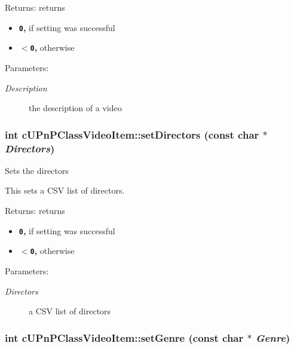 \begin{Desc}
\item[Returns:]returns\begin{itemize}
\item {\bf {\tt 0},} if setting was successful\item {\bf {\tt $<$0},} otherwise \end{itemize}
\end{Desc}
\begin{Desc}
\item[Parameters:]
\begin{description}
\item[{\em Description}]the description of a video \end{description}
\end{Desc}
\hypertarget{classcUPnPClassVideoItem_a5fc1a420bfd307bbd026c0681162e0a}{
\subsubsection[{setDirectors}]{\setlength{\rightskip}{0pt plus 5cm}int cUPnPClassVideoItem::setDirectors (const char $\ast$ {\em Directors})}}
\label{classcUPnPClassVideoItem_a5fc1a420bfd307bbd026c0681162e0a}


Sets the directors

This sets a CSV list of directors.

\begin{Desc}
\item[Returns:]returns\begin{itemize}
\item {\bf {\tt 0},} if setting was successful\item {\bf {\tt $<$0},} otherwise \end{itemize}
\end{Desc}
\begin{Desc}
\item[Parameters:]
\begin{description}
\item[{\em Directors}]a CSV list of directors \end{description}
\end{Desc}
\hypertarget{classcUPnPClassVideoItem_1be14ea33f9bbf53e636fea3658cc6f8}{
\subsubsection[{setGenre}]{\setlength{\rightskip}{0pt plus 5cm}int cUPnPClassVideoItem::setGenre (const char $\ast$ {\em Genre})}}
\label{classcUPnPClassVideoItem_1be14ea33f9bbf53e636fea3658cc6f8}


